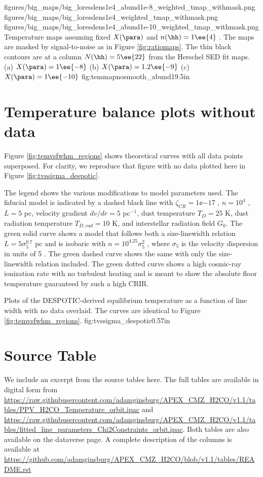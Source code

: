 \RotFigureThreeAA
{figures/big_maps/big_loresdens1e4_abund1e-8_weighted_tmap_withmask.png}
{figures/big_maps/big_loresdens1e4_weighted_tmap_withmask.png}
{figures/big_maps/big_loresdens1e4_abund1e-10_weighted_tmap_withmask.png}
{Temperature maps assuming fixed $X(\para)$ and $n(\hh)=1\ee{4}$ \percc.  The
maps are masked by signal-to-noise as in Figure \ref{fig:ratiomaps}.  The thin
black contours are at a column $N(\hh)=5\ee{22}$ \persc from the Herschel SED
fit maps.
(a) $X(\para) = 1\ee{-8}$
(b) $X(\para) = 1.2\ee{-9}$
(c) $X(\para) = 1\ee{-10}$
}
{fig:temmapnosmooth_abund}{1}{9.5in}

\section{Temperature balance plots without data}
\label{sec:despoticplots}
Figure \ref{fig:temvsfwhm_regions} shows theoretical curves with all data
points superposed.  For clarity, we reproduce that figure with no data plotted
here in Figure \ref{fig:tvssigma_despotic}.

The legend shows the various modifications to model parameters used.  The
fiducial model is indicated by a dashed black line with $\zeta_{CR} =
1\ee{-17}$ \pers, $n=10^4$ \percc, $L=5$ pc, velocity gradient $dv/dr=5$ \kms
pc$^{-1}$, dust temperature $T_D=25$ K, dust radiation temperature $T_{D,rad} =
10$ K, and interstellar radiation field $G_0$.  The green solid curve shows a
model that follows both a size-linewidth relation $L=5 \sigma_5^{0.7}$ pc and
is isobaric with $n=10^{4.25} \sigma_5^2$ \percc, where $\sigma_5$ is the
velocity dispersion in units of 5 \kms.  The green dashed curve shows the same
with only the size-linewidth relation included.  The green dotted curve shows a
high cosmic-ray ionization rate with no turbulent heating and is meant to show
the absolute floor temperature guaranteed by such a high CRIR.


{Plots of the DESPOTIC-derived equilibrium temperature as a function of line
width with no data overlaid.  The curves are identical to Figure
\ref{fig:temvsfwhm_regions}.}
{fig:tvssigma_despotic}{0.5}{7in}

\section{Source Table}
We include an excerpt from the source tables here.  The full tables are
available in digital form from
\url{https://raw.githubusercontent.com/adamginsburg/APEX_CMZ_H2CO/v1.1/tables/PPV_H2CO_Temperature_orbit.ipac}
and
\url{https://raw.githubusercontent.com/adamginsburg/APEX_CMZ_H2CO/v1.1/tables/fitted_line_parameters_Chi2Constraints_orbit.ipac}.
Both tables are also available on the dataverse page.
A complete description of the columns is available at
\url{https://github.com/adamginsburg/APEX_CMZ_H2CO/blob/v1.1/tables/README.rst}







